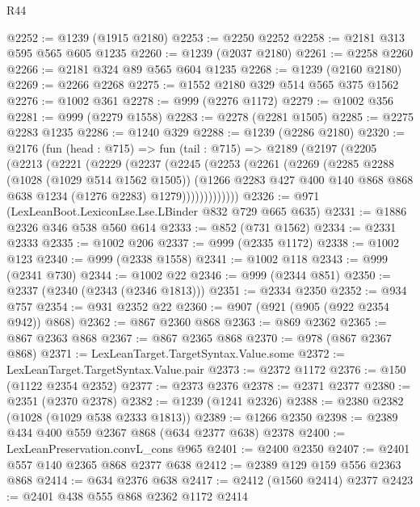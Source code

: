 \begin{lexlean}{R44}
\begin{coremodule}
@2252 := @1239 (@1915 @2180)
@2253 := @2250 @2252
@2258 := @2181 @313 @595 @565 @605 @1235
@2260 := @1239 (@2037 @2180)
@2261 := @2258 @2260
@2266 := @2181 @324 @89 @565 @604 @1235
@2268 := @1239 (@2160 @2180)
@2269 := @2266 @2268
@2275 := @1552 @2180 @329 @514 @565 @375 @1562
@2276 := @1002 @361
@2278 := @999 (@2276 @1172)
@2279 := @1002 @356
@2281 := @999 (@2279 @1558)
@2283 := @2278 (@2281 @1505)
@2285 := @2275 @2283 @1235
@2286 := @1240 @329
@2288 := @1239 (@2286 @2180)
@2320 := @2176
    (fun (head : @715) =>
    fun (tail : @715) =>
    @2189
      (@2197
        (@2205
          (@2213
            (@2221
              (@2229
                (@2237
                  (@2245
                    (@2253
                      (@2261
                        (@2269
                          (@2285
                            @2288
                            (@1028 (@1029 @514 @1562 @1505))
                            (@1266
                              @2283
                              @427
                              @400
                              @140
                              @868
                              @868
                              @638
                              @1234
                              (@1276 @2283)
                              @1279)))))))))))))
@2326 := @971 (LexLeanBoot.LexiconLse.Lse.LBinder @832 @729 @665 @635)
@2331 := @1886 @2326 @346 @538 @560 @614
@2333 := @852 (@731 @1562)
@2334 := @2331 @2333
@2335 := @1002 @206
@2337 := @999 (@2335 @1172)
@2338 := @1002 @123
@2340 := @999 (@2338 @1558)
@2341 := @1002 @118
@2343 := @999 (@2341 @730)
@2344 := @1002 @22
@2346 := @999 (@2344 @851)
@2350 := @2337 (@2340 (@2343 (@2346 @1813)))
@2351 := @2334 @2350
@2352 := @934 @757
@2354 := @931 @2352 @22
@2360 := @907 (@921 (@905 (@922 @2354 @942)) @868)
@2362 := @867 @2360 @868
@2363 := @869 @2362
@2365 := @867 @2363 @868
@2367 := @867 @2365 @868
@2370 := @978 (@867 @2367 @868)
@2371 := LexLeanTarget.TargetSyntax.Value.some
@2372 := LexLeanTarget.TargetSyntax.Value.pair
@2373 := @2372 @1172
@2376 := @150 (@1122 @2354 @2352)
@2377 := @2373 @2376
@2378 := @2371 @2377
@2380 := @2351 (@2370 @2378)
@2382 := @1239 (@1241 @2326)
@2388 := @2380 @2382 (@1028 (@1029 @538 @2333 @1813))
@2389 := @1266 @2350
@2398 := @2389 @434 @400 @559 @2367 @868 (@634 @2377 @638) @2378
@2400 := LexLeanPreservation.convL_cons @965
@2401 := @2400 @2350
@2407 := @2401 @557 @140 @2365 @868 @2377 @638
@2412 := @2389 @129 @159 @556 @2363 @868
@2414 := @634 @2376 @638
@2417 := @2412 (@1560 @2414) @2377
@2423 := @2401 @438 @555 @868 @2362 @1172 @2414

\end{coremodule}
\end{lexlean}
